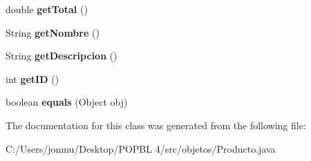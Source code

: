 \begin{DoxyCompactItemize}
double {\bfseries get\+Total} ()
\item 
\mbox{\label{classobjetos_1_1_producto_a57f2351473e89e49d44441154f6110ed}} 
String {\bfseries get\+Nombre} ()
\item 
\mbox{\label{classobjetos_1_1_producto_a47b9a05a0e7a504aaa56564c1b146927}} 
String {\bfseries get\+Descripcion} ()
\item 
\mbox{\label{classobjetos_1_1_producto_a60da2dbd5b5666a42c88295cf72fc193}} 
int {\bfseries get\+ID} ()
\item 
\mbox{\label{classobjetos_1_1_producto_a69f1b30e6711e637dbfd074c057adeee}} 
boolean {\bfseries equals} (Object obj)
\end{DoxyCompactItemize}


The documentation for this class was generated from the following file\+:\begin{DoxyCompactItemize}
\item 
C\+:/\+Users/jonmu/\+Desktop/\+P\+O\+P\+B\+L 4/src/objetos/Producto.\+java\end{DoxyCompactItemize}
